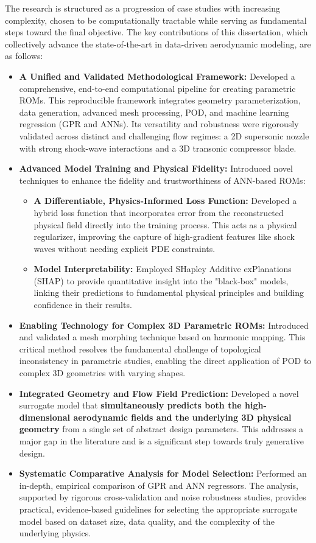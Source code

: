 \documentclass[dsc, EN]{ufabcFHZh}
\begin{document}
The research is structured as a progression of case studies with increasing complexity, chosen to be computationally tractable while serving as fundamental steps toward the final objective. The key contributions of this dissertation, which collectively advance the state-of-the-art in data-driven aerodynamic modeling, are as follows:

\begin{itemize}
    \item \textbf{A Unified and Validated Methodological Framework:} Developed a comprehensive, end-to-end computational pipeline for creating parametric ROMs. This reproducible framework integrates geometry parameterization, data generation, advanced mesh processing, POD, and machine learning regression (GPR and ANNs). Its versatility and robustness were rigorously validated across distinct and challenging flow regimes: a 2D supersonic nozzle with strong shock-wave interactions and a 3D transonic compressor blade.
    \item \textbf{Advanced Model Training and Physical Fidelity:} Introduced novel techniques to enhance the fidelity and trustworthiness of ANN-based ROMs:
        \begin{itemize}
            \item \textbf{A Differentiable, Physics-Informed Loss Function:} Developed a hybrid loss function that incorporates error from the reconstructed physical field directly into the training process. This acts as a physical regularizer, improving the capture of high-gradient features like shock waves without needing explicit PDE constraints.
            \item \textbf{Model Interpretability:} Employed SHapley Additive exPlanations (SHAP) to provide quantitative insight into the "black-box" models, linking their predictions to fundamental physical principles and building confidence in their results.
        \end{itemize}
    \item \textbf{Enabling Technology for Complex 3D Parametric ROMs:} Introduced and validated a mesh morphing technique based on harmonic mapping. This critical method resolves the fundamental challenge of topological inconsistency in parametric studies, enabling the direct application of POD to complex 3D geometries with varying shapes.
    \item \textbf{Integrated Geometry and Flow Field Prediction:} Developed a novel surrogate model that \textbf{simultaneously predicts both the high-dimensional aerodynamic fields and the underlying 3D physical geometry} from a single set of abstract design parameters. This addresses a major gap in the literature and is a significant step towards truly generative design.
    \item \textbf{Systematic Comparative Analysis for Model Selection:} Performed an in-depth, empirical comparison of GPR and ANN regressors. The analysis, supported by rigorous cross-validation and noise robustness studies, provides practical, evidence-based guidelines for selecting the appropriate surrogate model based on dataset size, data quality, and the complexity of the underlying physics.
\end{itemize}
\end{document}
